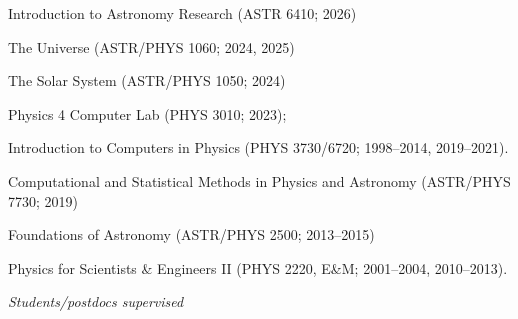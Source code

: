 \documentclass[11pt]{article}
\begin{document}
\begin{list}{\mbox{}}{%
\setlength{\partopsep}{0.0in}%
\setlength{\itemindent}{-0.7in}%
\setlength{\leftmargin}{1.2in}%
\setlength{\parsep}{-2.75pt}
}
\vspace{-16.5pt}

\item
Introduction to Astronomy Research (ASTR 6410; 2026)
\item
The Universe (ASTR/PHYS 1060; 2024, 2025)
\item
The Solar System (ASTR/PHYS 1050; 2024)
\item
Physics 4 Computer Lab (PHYS 3010; 2023); 
\item
Introduction to Computers in Physics (PHYS 3730/6720; 
1998--2014, 2019--2021). 
\item 
Computational and Statistical Methods in Physics and Astronomy (ASTR/PHYS 7730; 2019)
\item 
Foundations of Astronomy (ASTR/PHYS 2500; 2013--2015)
\item
Physics for Scientists \& Engineers II
(PHYS 2220, E\&M; 2001--2004, 2010--2013).
\end{list}

\centerline{\em Students/postdocs supervised}
\end{document}
